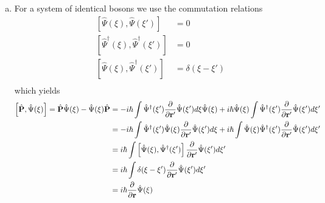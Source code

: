 \documentclass[11pt]{article}
\numberwithin{equation}{section}
\begin{document}
\begin{enumerate}[(a)]
\item For a system of identical bosons we use the commutation relations
\begin{align*}
\left[\hat{\Psi}(\xi),\hat{\Psi}(\xi')\right] &= 0\\
\left[\hat{\Psi}^{\dagger}(\xi),\hat{\Psi}^{\dagger}(\xi')\right] &= 0\\
\left[\hat{\Psi}(\xi),\hat{\Psi}^{\dagger}(\xi')\right] &= \delta(\xi-\xi')\\
\end{align*}
which yields
\begin{align*}
\left[\hat{\mathbf{P}},\hat{\Psi}(\xi)\right] = \hat{\mathbf{P}}\hat{\Psi}(\xi) - \hat{\Psi}(\xi)\hat{\mathbf{P}} &= -i\hbar\int\hat{\Psi}^{\dagger}(\xi')\frac{\partial{}}{\partial{\mathbf{r}'}}\hat{\Psi}(\xi')d\xi\hat{\Psi}(\xi) + i\hbar\hat{\Psi}(\xi)\int\hat{\Psi}^{\dagger}(\xi')\frac{\partial{}}{\partial{\mathbf{r}'}}\hat{\Psi}(\xi')d\xi'\\
&= -i\hbar\int\hat{\Psi}^{\dagger}(\xi')\hat{\Psi}(\xi)\frac{\partial{}}{\partial{\mathbf{r}'}}\hat{\Psi}(\xi')d\xi + i\hbar\int\hat{\Psi}(\xi)\hat{\Psi}^{\dagger}(\xi')\frac{\partial{}}{\partial{\mathbf{r}'}}\hat{\Psi}(\xi')d\xi'\\
&= i\hbar\int\left[\hat{\Psi}(\xi),\hat{\Psi}^{\dagger}(\xi')\right]\frac{\partial{}}{\partial{\mathbf{r}'}}\hat{\Psi}(\xi')d\xi'\\
&= i\hbar\int\delta(\xi-\xi')\frac{\partial{}}{\partial{\mathbf{r}'}}\hat{\Psi}(\xi')d\xi'\\
&= i\hbar\frac{\partial{}}{\partial{\mathbf{r}}}\hat{\Psi}(\xi)
\end{align*}
\end{enumerate}

\pagebreak
\end{document}
